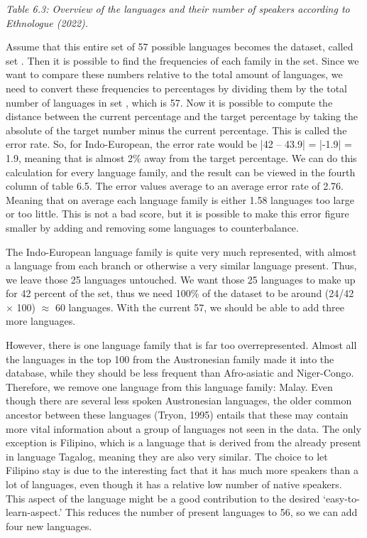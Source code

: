 \vspace{0.1cm}
{\it \footnotesize Table 6.3: Overview of the languages and their number of speakers according to Ethnologue (2022).}
\vspace{0.3cm}


\noindent Assume that this entire set of 57 possible languages becomes the dataset, called set \alpha. Then it is possible to find the frequencies of each family in the \alpha set. Since we want to compare these numbers relative to the total amount of languages, we need to convert these frequencies to percentages by dividing them by the total number of languages in set \alpha, which is 57. Now it is possible to compute the distance between the current percentage and the target percentage by taking the absolute of the target number minus the current percentage. This is called the error rate. So, for Indo-European, the error rate would be |42 – 43.9| = |-1.9| = 1.9, meaning that is almost 2\% away from the target percentage. We can do this calculation for every language family, and the result can be viewed in the fourth column of table 6.5. The error values average to an average error rate of 2.76. Meaning that on average each language family is either 1.58 languages too large or too little. This is not a bad score, but it is possible to make this error figure smaller by adding and removing some languages to counterbalance. 

The Indo-European language family is quite very much represented, with almost a language from each branch or otherwise a very similar language present. Thus, we leave those 25 languages untouched. We want those 25 languages to make up for 42 percent of the set, thus we need 100\% of the dataset to be around (24/42 $\times$ 100) $\approx$ 60 languages. With the current 57, we should be able to add three more languages. 

However, there is one language family that is far too overrepresented. Almost all the languages in the top 100 from the Austronesian family made it into the  database, while they should be less frequent than Afro-asiatic and Niger-Congo. Therefore, we remove one language from this language family: Malay. Even though there are several less spoken Austronesian languages, the older common ancestor between these languages (Tryon, 1995) entails that these may contain more vital information about a group of languages not seen in the data. The only exception is Filipino, which is a language that is derived from the already present in  language Tagalog, meaning they are also very similar. The choice to let Filipino stay is due to the interesting fact that it has much more speakers than a lot of languages, even though it has a relative low number of native speakers. This aspect of the language might be a good contribution to the desired ‘easy-to-learn-aspect.’ This reduces the number of present languages to 56, so we can add four new languages. 

